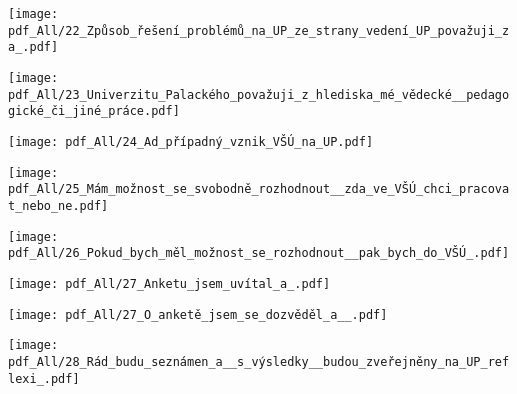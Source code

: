 {  \centerline{\texttt{[image: pdf\_All/22\_Způsob\_řešení\_problémů\_na\_UP\_ze\_strany\_vedení\_UP\_považuji\_za\_.pdf]}  } }


{  \centerline{\texttt{[image: pdf\_All/23\_Univerzitu\_Palackého\_považuji\_z\_hlediska\_mé\_vědecké\_\_pedagogické\_či\_jiné\_práce.pdf]}  } }


{  \centerline{\texttt{[image: pdf\_All/24\_Ad\_případný\_vznik\_VŠÚ\_na\_UP.pdf]}  } }


{  \centerline{\texttt{[image: pdf\_All/25\_Mám\_možnost\_se\_svobodně\_rozhodnout\_\_zda\_ve\_VŠÚ\_chci\_pracovat\_nebo\_ne.pdf]}  } }


{  \centerline{\texttt{[image: pdf\_All/26\_Pokud\_bych\_měl\_možnost\_se\_rozhodnout\_\_pak\_bych\_do\_VŠÚ\_.pdf]}  } }


{  \centerline{\texttt{[image: pdf\_All/27\_Anketu\_jsem\_uvítal\_a\_.pdf]}  } }


{  \centerline{\texttt{[image: pdf\_All/27\_O\_anketě\_jsem\_se\_dozvěděl\_a\_\_.pdf]}  } }


{  \centerline{\texttt{[image: pdf\_All/28\_Rád\_budu\_seznámen\_a\_\_s\_výsledky\_\_budou\_zveřejněny\_na\_UP\_reflexi\_.pdf]}  } }


